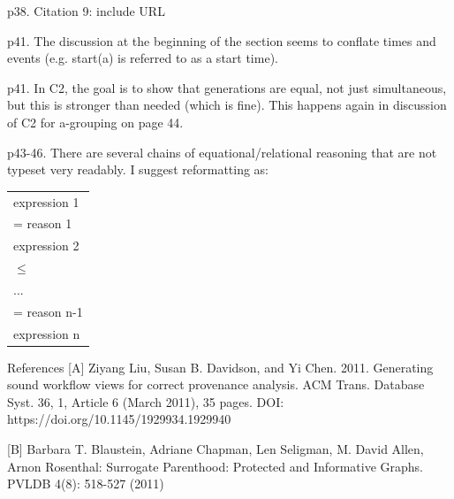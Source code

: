 \documentclass{article}
\newcommand{\showColour}{yes} %
\newcommand{\showComments}{yes} %
\newcommand{\note}[2]{\ifthenelse{\equal{\showColour}{yes}}{\textcolor{#1}{#2}}{#2}}
\newcommand{\jwb}[1]{\note{blue}{#1}}
\newcommand{\com}[2]{\ifthenelse{\equal{\showComments}{yes}}{\textcolor{#1}{#2}}{}}
\newcommand{\comment}[1]{\com{red}{#1}}
\begin{document}
p38. Citation 9: include URL

\jwb{Done.}

p41.  The discussion at the beginning of the section seems to conflate times and events (e.g. start(a) is referred to as a start time).

\comment{how do we write ``time at which start(a) occurs''?}

p41. In C2, the goal is to show that generations are equal, not just simultaneous, but this is stronger than needed (which is fine).  This happens again in discussion of C2 for a-grouping on page 44.

p43-46.  There are several chains of equational/relational reasoning that are not typeset very readably.  I suggest reformatting as:

\begin{tabular}{l}
expression 1 \\ 
 = { reason 1} \\
expression 2 \\
 $\leq$ \\
 ... \\
 = {reason n-1} \\
expression n \\
\end{tabular}

References
[A] Ziyang Liu, Susan B. Davidson, and Yi Chen. 2011. Generating sound workflow views for correct provenance analysis. ACM Trans. Database Syst. 36, 1, Article 6 (March 2011), 35 pages. DOI: https://doi.org/10.1145/1929934.1929940

[B] Barbara T. Blaustein, Adriane Chapman, Len Seligman, M. David Allen, Arnon Rosenthal:
Surrogate Parenthood: Protected and Informative Graphs. PVLDB 4(8): 518-527 (2011)




\end{document}
